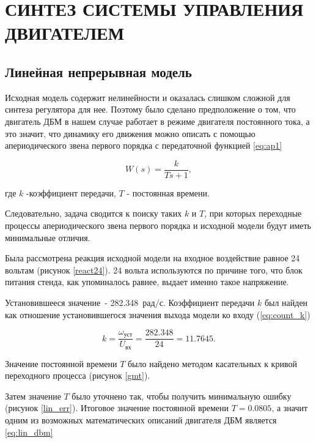 \section{СИНТЕЗ СИСТЕМЫ УПРАВЛЕНИЯ ДВИГАТЕЛЕМ}

\subsection{Линейная непрерывная модель}

Исходная модель содержит нелинейности и оказалась слишком сложной для синтеза регулятора для нее.
Поэтому было сделано предположение о том, что двигатель ДБМ в нашем случае работает
в режиме двигателя постоянного тока, а это значит, что динамику его движения можно
описать с помощью апериодического звена первого порядка с передаточной функцией \ref{eq:ap1}

\begin{equation}
  W(s)=\frac{k}{Ts+1},
  \label{eq:ap1}
\end{equation}

где $k$ -коэффициент передачи, $T$ - постоянная времени.

Следовательно, задача сводится к поиску таких $k$ и $T$, при которых переходные процессы
апериодического звена первого порядка и исходной модели будут иметь минимальные отличия.

Была рассмотрена реакция исходной модели на входное воздействие равное 24 вольтам (рисунок \ref{react24}).
24 вольта используются по причине того, что блок питания стенда, как упоминалось равнее, выдает 
именно такое напряжение.


Установившееся значение~- 282.348~рад/с.
Коэффициент передачи $k$ был найден как отношение установившегося значения выхода модели ко входу (\ref{eq:count_k})

\begin{equation}
  k = \frac{\omega_{\text{уст}}}{U_{\text{вх}}} = \frac{282.348}{24} = 11.7645.
  \label{eq:count_k}
\end{equation}

Значение постоянной времени $T$ было найдено методом касательных к кривой переходного
процесса (рисунок \ref{gmt}).


Затем значение $T$ было уточнено так, чтобы получить минимальную ошибку (рисунок \ref{lin_err}).
Итоговое значение постоянной времени $T = 0.0805$, а значит одним из возможных
математических описаний двигателя ДБМ является \ref{eq:lin_dbm}


